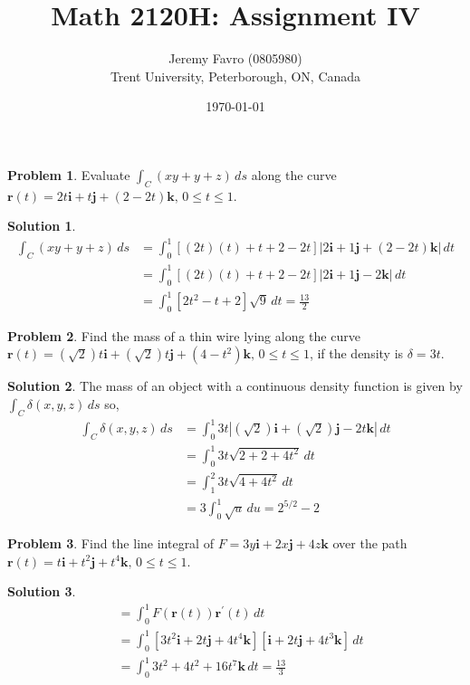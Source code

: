 \documentclass[10pt]{article}
\title{Math 2120H: Assignment IV}
\author{Jeremy Favro (0805980) \\ Trent University, Peterborough, ON, Canada}
\date{\today}
\theoremstyle{definition}
\newtheorem{problem}{Problem}
\newtheorem{soln}{Solution}
\newcommand{\ui}{\mathbf{i}}
\newcommand{\uj}{\mathbf{j}}
\newcommand{\uk}{\mathbf{k}}
\begin{document}
\maketitle

\begin{problem}
Evaluate $\int_C(xy+y+z)\,ds$ along the curve $\mathbf{r}(t)=2t\ui+t\uj+(2-2t)\uk,\,0\leq t\leq 1$.
\end{problem}
\begin{soln}
  \begin{align*}
    \int_C(xy+y+z)\,ds & =\int_0^1\left[(2t)(t)+t+2-2t\right]\left|2\ui+1\uj+(2-2t)\uk\right|\,dt \\
                       & =\int_0^1\left[(2t)(t)+t+2-2t\right]\left|2\ui+1\uj-2\uk\right|\,dt      \\
                       & =\int_0^1 \left[2t^2-t+2\right]\sqrt{9}\,dt=\frac{13}{2}
  \end{align*}
\end{soln}

\begin{problem}
Find the mass of a thin wire lying along the curve $\mathbf{r}(t)=(\sqrt{2})t\ui+(\sqrt{2})t\uj+(4-t^2)\uk,\,0\leq t\leq 1$, if the density is $\delta=3t$.
\end{problem}
\begin{soln}
  The mass of an object with a continuous density function is given by $\int_C\delta(x,y,z)\,ds$ so,
  \begin{align*}
    \int_C\delta(x,y,z)\,ds & =\int_0^1 3t\left|(\sqrt{2})\ui+(\sqrt{2})\uj-2t\uk\right|\,dt \\
                            & =\int_0^1 3t\sqrt{2+2+4t^2}\,dt                                \\
                            & =\int_1^2 3t\sqrt{4+4t^2}\,dt                                  \\
                            & =3\int_0^1 \sqrt{u}\,du=2^{5/2}-2
  \end{align*}
\end{soln}

\begin{problem}
Find the line integral of $F = 3y\ui + 2x\uj + 4z\uk$ over the path $\mathbf{r}(t) = t\ui + t^2\uj + t^4\uk,\,0 \leq t \leq 1$.
\end{problem}
\begin{soln}
  \begin{align*}
     & =\int_0^1F(\mathbf{r}(t))\mathbf{r}^\prime(t)\,dt                                      \\
     & =\int_0^1 \left[3t^2\ui + 2t\uj + 4t^4\uk\right]\left[\ui + 2t\uj + 4t^3\uk\right]\,dt \\
     & =\int_0^1 3t^2 + 4t^2 + 16t^7\uk\,dt=\frac{13}{3}
  \end{align*}
\end{soln}
\end{document}
